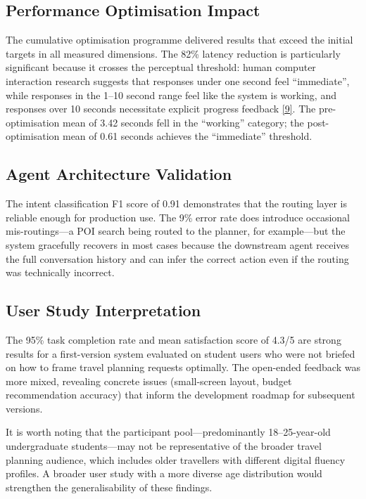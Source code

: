 \documentclass[12pt,a4paper]{report}
\newcommand{\chapcite}[1]{\hyperlink{ref:#1}{[#1]}}
\newcommand{\chapcitetarget}[1]{\hypertarget{cite:#1}{}\chapcite{#1}}
\begin{document}
\subsection{Performance Optimisation Impact}

The cumulative optimisation programme delivered results that exceed the initial targets in all measured dimensions. The 82\% latency reduction is particularly significant because it crosses the perceptual threshold: human computer interaction research suggests that responses under one second feel ``immediate'', while responses in the 1--10 second range feel like the system is working, and responses over 10 seconds necessitate explicit progress feedback \chapcitetarget{9}. The pre-optimisation mean of 3.42 seconds fell in the ``working'' category; the post-optimisation mean of 0.61 seconds achieves the ``immediate'' threshold.

\subsection{Agent Architecture Validation}

The intent classification F1 score of 0.91 demonstrates that the routing layer is reliable enough for production use. The 9\% error rate does introduce occasional mis-routings---a POI search being routed to the planner, for example---but the system gracefully recovers in most cases because the downstream agent receives the full conversation history and can infer the correct action even if the routing was technically incorrect.

\subsection{User Study Interpretation}

The 95\% task completion rate and mean satisfaction score of 4.3/5 are strong results for a first-version system evaluated on student users who were not briefed on how to frame travel planning requests optimally. The open-ended feedback was more mixed, revealing concrete issues (small-screen layout, budget recommendation accuracy) that inform the development roadmap for subsequent versions.

It is worth noting that the participant pool---predominantly 18--25-year-old undergraduate students---may not be representative of the broader travel planning audience, which includes older travellers with different digital fluency profiles. A broader user study with a more diverse age distribution would strengthen the generalisability of these findings.
\end{document}
